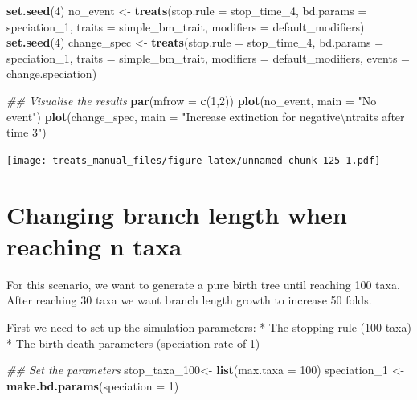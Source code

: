 \documentclass[
]{book}
\newenvironment{Shaded}{\begin{snugshade}}{\end{snugshade}}
\newcommand{\CharTok}[1]{\textcolor[rgb]{0.31,0.60,0.02}{#1}}
\newcommand{\CommentTok}[1]{\textcolor[rgb]{0.56,0.35,0.01}{\textit{#1}}}
\newcommand{\DataTypeTok}[1]{\textcolor[rgb]{0.13,0.29,0.53}{#1}}
\newcommand{\DecValTok}[1]{\textcolor[rgb]{0.00,0.00,0.81}{#1}}
\newcommand{\KeywordTok}[1]{\textcolor[rgb]{0.13,0.29,0.53}{\textbf{#1}}}
\newcommand{\NormalTok}[1]{#1}
\newcommand{\StringTok}[1]{\textcolor[rgb]{0.31,0.60,0.02}{#1}}
\begin{document}
\begin{Shaded}
\begin{Highlighting}[]
\KeywordTok{set.seed}\NormalTok{(}\DecValTok{4}\NormalTok{)}
\NormalTok{no\_event \textless{}{-}}\StringTok{ }\KeywordTok{treats}\NormalTok{(}\DataTypeTok{stop.rule =}\NormalTok{ stop\_time\_}\DecValTok{4}\NormalTok{,}
                 \DataTypeTok{bd.params =}\NormalTok{ speciation\_}\DecValTok{1}\NormalTok{,}
                 \DataTypeTok{traits    =}\NormalTok{ simple\_bm\_trait,}
                 \DataTypeTok{modifiers =}\NormalTok{ default\_modifiers)}
\KeywordTok{set.seed}\NormalTok{(}\DecValTok{4}\NormalTok{)}
\NormalTok{change\_spec \textless{}{-}}\StringTok{ }\KeywordTok{treats}\NormalTok{(}\DataTypeTok{stop.rule =}\NormalTok{ stop\_time\_}\DecValTok{4}\NormalTok{,}
                    \DataTypeTok{bd.params =}\NormalTok{ speciation\_}\DecValTok{1}\NormalTok{,}
                    \DataTypeTok{traits    =}\NormalTok{ simple\_bm\_trait,}
                    \DataTypeTok{modifiers =}\NormalTok{ default\_modifiers,}
                    \DataTypeTok{events    =}\NormalTok{ change.speciation)}

\CommentTok{\#\# Visualise the results}
\KeywordTok{par}\NormalTok{(}\DataTypeTok{mfrow =} \KeywordTok{c}\NormalTok{(}\DecValTok{1}\NormalTok{,}\DecValTok{2}\NormalTok{))}
\KeywordTok{plot}\NormalTok{(no\_event, }\DataTypeTok{main =} \StringTok{"No event"}\NormalTok{)}
\KeywordTok{plot}\NormalTok{(change\_spec, }\DataTypeTok{main =} \StringTok{"Increase extinction for negative}\CharTok{\textbackslash{}n}\StringTok{traits after time 3"}\NormalTok{)}
\end{Highlighting}
\end{Shaded}

\texttt{[image: treats\_manual\_files/figure-latex/unnamed-chunk-125-1.pdf]}

\hypertarget{EG_modify_brlen}{%
\section{Changing branch length when reaching n taxa}\label{EG_modify_brlen}}

For this scenario, we want to generate a pure birth tree until reaching 100 taxa.
After reaching 30 taxa we want branch length growth to increase 50 folds.

First we need to set up the simulation parameters:
* The stopping rule (100 taxa)
* The birth-death parameters (speciation rate of 1)

\begin{Shaded}
\begin{Highlighting}[]
\CommentTok{\#\# Set the parameters}
\NormalTok{stop\_taxa\_}\DecValTok{100}\NormalTok{\textless{}{-}}\StringTok{ }\KeywordTok{list}\NormalTok{(}\DataTypeTok{max.taxa =} \DecValTok{100}\NormalTok{)}
\NormalTok{speciation\_}\DecValTok{1}\NormalTok{ \textless{}{-}}\StringTok{ }\KeywordTok{make.bd.params}\NormalTok{(}\DataTypeTok{speciation =} \DecValTok{1}\NormalTok{)}
\end{Highlighting}
\end{Shaded}
\end{document}
